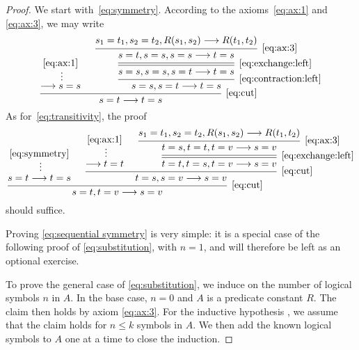 \documentclass[11pt,a4paper]{article}
\begin{document}
\begin{proof}
    We start with~\eqref{eq:symmetry}.
    According to the axioms~\eqref{eq:ax:1} and \eqref{eq:ax:3},
    we may write
    \begin{equation*}
        \begin{prooftree}
            \hypo{\eqref{eq:ax:1}}
            \ellipsis{}{\seq s=s}
            \hypo{s_1 = t_1, s_2 = t_2, R(s_1,s_2) \seq R(t_1,t_2)}
            \infer1[\eqref{eq:ax:3}]{s=t, s=s, s=s\seq t=s}
            \infer[double]1[\eqref{eq:exchange:left}]{s=s, s=s, s=t \seq t=s}
            \infer1[\eqref{eq:contraction:left}]{s=s, s=t \seq t=s}
            \infer2[\eqref{eq:cut}]{s = t\seq t = s}
        \end{prooftree}
    \end{equation*}
    As for~\eqref{eq:transitivity}, the proof
    \begin{equation*}
        \begin{prooftree}
            \hypo{\eqref{eq:symmetry}}
            \ellipsis{}{s = t\seq t = s}
            \hypo{\eqref{eq:ax:1}}
            \ellipsis{}{\seq t = t}
            \hypo{s_1 = t_1, s_2 = t_2, R(s_1,s_2) \seq R(t_1,t_2)}
            \infer1[\eqref{eq:ax:3}]{t=s, t=t ,t=v\seq s=v}
            \infer[double]1[\eqref{eq:exchange:left}]{t=t, t=s, t=v \seq s=v}
            \infer2[\eqref{eq:cut}]{t=s, s=v\seq s=v}
            \infer2[\eqref{eq:cut}]{s = t, t = v\seq s = v}
        \end{prooftree}
    \end{equation*}
    should suffice.

    Proving \eqref{eq:sequential symmetry} is very simple:
    it is a special case of the following proof of
    \eqref{eq:substitution}, with \(n=1\), and will therefore
    be left as an optional exercise.

    To prove the general case of \eqref{eq:substitution},
    we induce on the number of logical symbols \(n\) in \(A\).
    In the base case, \(n = 0\) and \(A\) is a predicate constant \(R\).
    The claim then holds by axiom \eqref{eq:ax:3}.
    For the inductive hypothesis \IH{}, we assume that the claim holds
    for \(n\leq k\) symbols in \(A\). We then add the known logical symbols
    to \(A\) one at a time to close the induction.


\end{proof}
\end{document}
